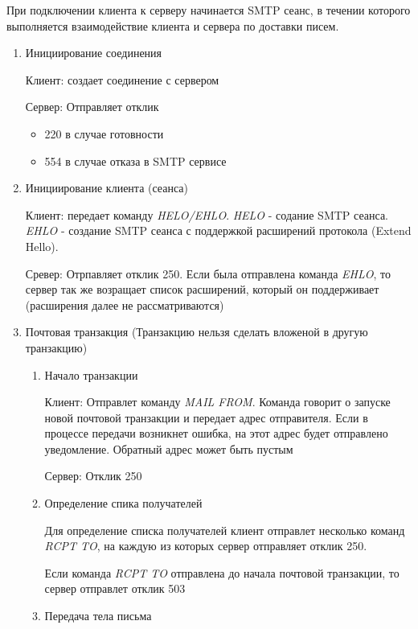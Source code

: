 \documentclass[a4paper,12pt]{report}
\begin{document}
	 При подключении клиента к серверу начинается SMTP сеанс, в течении которого выполняется взаимодействие клиента и сервера по доставки писем.
	 \begin{enumerate}
	     \item Инициирование соединения 
	     
	     Клиент: создает соединение с сервером
	     
	     Сервер: Отправляет отклик
	     \begin{itemize}
	         \item 220 в случае готовности
	         \item 554 в случае отказа в SMTP сервисе
	     \end{itemize}
	     \item Инициирование клиента (сеанса)
	     
	     Клиент: передает команду \textit{HELO/EHLO}. \textit{HELO} - содание SMTP сеанса. \textit{EHLO} - создание SMTP сеанса с поддержкой расширений протокола (Extend Hello).
	     
	     Сревер: Отрпавляет отклик 250. Если была отправлена команда \textit{EHLO}, то сервер так же возращает список расширений, который он поддерживает (расширения далее не рассматриваются)
	     
	     \item Почтовая транзакция (Транзакцию нельзя сделать вложеной в другую транзакцию)
	     \begin{enumerate}
	         \item \label{item:mail_transaction} Начало транзакции
	         
	         Клиент: Отправлет команду \textit{MAIL FROM}. Команда говорит о запуске новой почтовой транзакции и передает адрес отправителя. Если в процессе передачи возникнет ошибка, на этот адрес будет отправлено уведомление. Обратный адрес может быть пустым
	         
	         Сервер: Отклик 250
	         
	         \item Определение спика получателей
	         
	         Для определение списка получателей клиент отправлет несколько команд \textit{RCPT TO}, на каждую из которых сервер отправляет отклик 250.
	         
	         Если команда \textit{RCPT TO} отправлена до начала почтовой транзакции, то сервер отправлет отклик 503
	         
	         \item Передача тела письма 
	         

\end{enumerate}
\end{enumerate}
\end{document}
